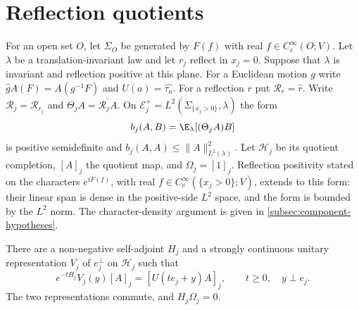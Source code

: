 \section{Reflection quotients}\label{sec:quotients}
For an open set $O$, let $\Sigma_O$ be generated by $F(f)$ with
real $f\in C_c^\infty(O;V)$. Let $\lambda$ be a
translation-invariant law and let $r_j$ reflect in $x_j=0$.
Suppose that $\lambda$ is invariant and reflection positive at this
plane. For a Euclidean motion $g$ write
$\widehat g A(F)=A(g^{-1}F)$ and $U(a)=\widehat{\tau_a}$.
For a reflection $r$ put
$\mathcal R_r=\widehat r$. Write $\mathcal R_j=\mathcal R_{r_j}$ and
$\Theta_j A=\overline{\mathcal R_j A}$.
On $\mathcal E_j^+=L^2(\Sigma_{\{x_j>0\}},\lambda)$ the form
\[
 b_j(A,B)=\E_\lambda[(\Theta_j A)B]
\]
is positive semidefinite and $b_j(A,A)\le\|A\|_{L^2(\lambda)}^2$.
Let $\mathcal H_j$ be its quotient completion, $[A]_j$ the quotient
map, and $\Omega_j=[1]_j$.
Reflection positivity stated on the characters $e^{iF(f)}$, with
real $f\in C_c^\infty(\{x_j>0\};V)$, extends to this form:
their linear span is dense in the positive-side $L^2$ space, and the
form is bounded by the $L^2$ norm. The character-density argument is
given in \cref{subsec:component-hypotheses}.

\begin{proposition}\label{prop:axis-reconstruction}
There are a non-negative self-adjoint $H_j$ and a strongly continuous
unitary representation $V_j$ of $e_j^\perp$ on $\mathcal H_j$ such
that
\begin{equation}\label{eq:axis-semigroup}
 e^{-tH_j}V_j(y)[A]_j=[U(te_j+y)A]_j,
 \qquad t\ge0,\quad y\perp e_j.
\end{equation}
The two representations commute, and $H_j\Omega_j=0$.
\end{proposition}

